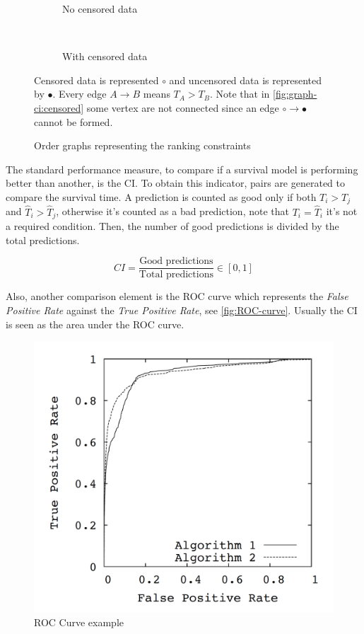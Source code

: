\begin{figure}
  \centering
  \begin{subfigure}[b]{.4\textwidth}
    \centering
    
    \caption{No censored data}
  \end{subfigure}
  ~
  \begin{subfigure}[b]{.4\textwidth}
    \centering
    
    \caption{With censored data}
    \label{fig:graph-ci:censored}
  \end{subfigure}

  \caption{Order graphs representing the ranking constraints \label{fig:graph-ci}}

  Censored data is represented \( \circ \) and uncensored data is represented by \( \bullet \).
  Every edge \( A \rightarrow B \) means \( T_A > T_B \). Note that in 
  \autoref{fig:graph-ci:censored} some vertex are not connected since an edge 
  \( \circ \rightarrow \bullet \) cannot be formed.
\end{figure}

The standard performance measure, to compare if a survival 
model is performing better than another, is the \gls{CI}. To obtain this 
indicator, pairs are generated to compare the survival time. A prediction is counted as good only
if both \( T_i > T_j \) and \( \hat{T}_i > \hat{T}_j \), otherwise
it's counted as a bad prediction, note that \( T_i = \hat{T}_i \) it's not a required condition. 
Then, the number of good predictions is divided by the total predictions. 
~\cite{medical:ranking-ci}

\[
  CI = \frac{\text{Good predictions}}{\text{Total predictions}} \in [0, 1]
\]

Also, another comparison 
element is the \gls{ROC} curve which represents the \emph{False Positive Rate} against the 
\emph{True Positive Rate}, see \autoref{fig:ROC-curve}. Usually the \gls{CI} is seen as 
the area under the \gls{ROC} curve.
~\cite{neural:roc-precision-recall}

\begin{figure}
  \centering
  \includegraphics[width=.5\linewidth]{images/roc_curve}
  \caption{\acrshort{ROC} Curve example\label{fig:ROC-curve}}
\end{figure}

